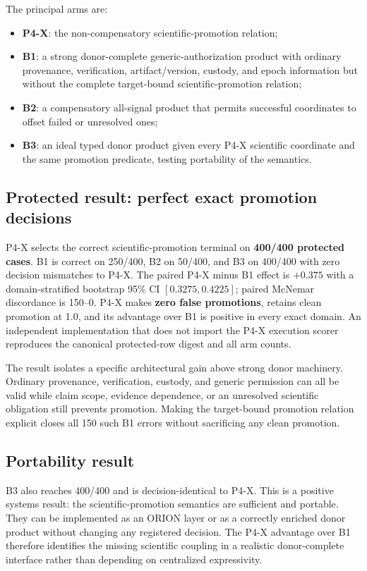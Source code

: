 The principal arms are:
\begin{itemize}
  \item \textbf{P4-X}: the non-compensatory scientific-promotion relation;
  \item \textbf{B1}: a strong donor-complete generic-authorization product with ordinary provenance, verification, artifact/version, custody, and epoch information but without the complete target-bound scientific-promotion relation;
  \item \textbf{B2}: a compensatory all-signal product that permits successful coordinates to offset failed or unresolved ones;
  \item \textbf{B3}: an ideal typed donor product given every P4-X scientific coordinate and the same promotion predicate, testing portability of the semantics.
\end{itemize}

\subsection{Protected result: perfect exact promotion decisions}

P4-X selects the correct scientific-promotion terminal on \textbf{400/400 protected cases}. B1 is correct on 250/400, B2 on 50/400, and B3 on 400/400 with zero decision mismatches to P4-X. The paired P4-X minus B1 effect is \textbf{$+0.375$} with a domain-stratified bootstrap 95\% CI $[0.3275,0.4225]$; paired McNemar discordance is 150--0. P4-X makes \textbf{zero false promotions}, retains clean promotion at 1.0, and its advantage over B1 is positive in every exact domain. An independent implementation that does not import the P4-X execution scorer reproduces the canonical protected-row digest and all arm counts.

The result isolates a specific architectural gain above strong donor machinery. Ordinary provenance, verification, custody, and generic permission can all be valid while claim scope, evidence dependence, or an unresolved scientific obligation still prevents promotion. Making the target-bound promotion relation explicit closes all 150 such B1 errors without sacrificing any clean promotion.

\subsection{Portability result}

B3 also reaches 400/400 and is decision-identical to P4-X. This is a positive systems result: the scientific-promotion semantics are sufficient and portable. They can be implemented as an ORION layer or as a correctly enriched donor product without changing any registered decision. The P4-X advantage over B1 therefore identifies the missing scientific coupling in a realistic donor-complete interface rather than depending on centralized expressivity.

